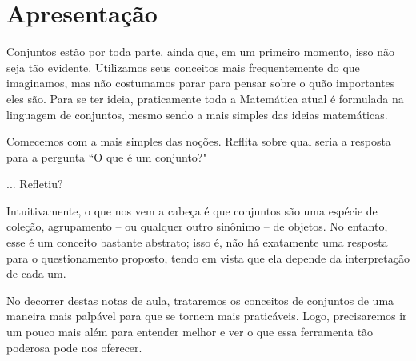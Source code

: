 \section{Apresentação}

Conjuntos estão por toda parte, ainda que, em um primeiro momento, isso não seja tão evidente. Utilizamos seus conceitos mais frequentemente do que imaginamos, mas não costumamos parar para pensar sobre o quão importantes eles são.
Para se ter ideia, praticamente toda a Matemática atual é formulada na linguagem de conjuntos, mesmo sendo a mais simples das ideias matemáticas.

Comecemos com a mais simples das noções. Reflita sobre qual seria a resposta para a pergunta ``O que é um conjunto?"

... Refletiu?

Intuitivamente, o que nos vem a cabeça é que conjuntos são uma espécie de coleção, agrupamento -- ou qualquer outro sinônimo -- de objetos.
No entanto, esse é um conceito bastante abstrato; isso é, não há exatamente uma resposta para o questionamento proposto, tendo em vista que ela depende da interpretação de cada um.

No decorrer destas notas de aula, trataremos os conceitos de conjuntos de uma maneira mais palpável para que se tornem mais praticáveis.
Logo, precisaremos ir um pouco mais além para entender melhor e ver o que essa ferramenta tão poderosa pode nos oferecer.
